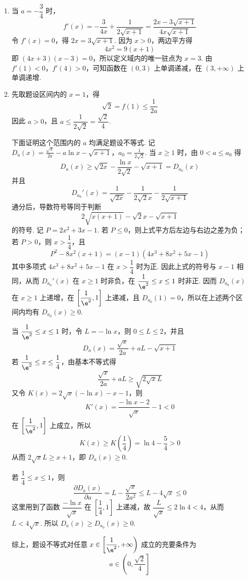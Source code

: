 \begin{solution}
\begin{enumerate}
\item 当 \(a=-\dfrac34\) 时，
\[
f'(x)=-\frac{3}{4x}+\frac{1}{2\sqrt{x+1}}=\frac{2x-3\sqrt{x+1}}{4x\sqrt{x+1}}
\]
令 \(f'(x)=0\)，得 \(2x=3\sqrt{x+1}\). 因为 \(x>0\)，两边平方得
\[
4x^2=9(x+1)
\]
即 \((4x+3)(x-3)=0\)，所以定义域内的唯一驻点为 \(x=3\). 由 \(f'(1)<0\)，\(f'(4)>0\)，可知函数在 \((0,3)\) 上单调递减，在 \((3,+\infty)\) 上单调递增.

\item 先取题设区间内的 \(x=1\)，得
\[
\sqrt2=f(1)\le\frac{1}{2a}
\]
因此 \(a>0\)，且 \(a\le\dfrac{1}{2\sqrt2}=\dfrac{\sqrt2}{4}\).

下面证明这个范围内的 \(a\) 均满足题设不等式. 记
\(D_a(x)=\frac{\sqrt{x}}{2a}-a\ln x-\sqrt{x+1}\)，\(a_0=\frac{1}{2\sqrt2}\).
当 \(x\ge1\) 时，由 \(0<a\le a_0\) 得
\[
D_a(x)\ge\sqrt{2x}-\frac{\ln x}{2\sqrt2}-\sqrt{x+1}=D_{a_0}(x)
\]
并且
\[
D_{a_0}'(x)=\frac{1}{\sqrt{2x}}-\frac{1}{2\sqrt2x}-\frac{1}{2\sqrt{x+1}}
\]
通分后，导数符号等同于判断
\[
2\sqrt{x(x+1)}-\sqrt2x-\sqrt{x+1}
\]
的符号. 记 \(P=2x^2+3x-1\). 若 \(P\le0\)，则上式平方后左边与右边之差为负；若 \(P>0\)，则 \(x>\dfrac14\)，且
\[
P^2-8x^2(x+1)=(x-1)(4x^3+8x^2+5x-1)
\]
其中多项式 \(4x^3+8x^2+5x-1\) 在 \(x>\dfrac14\) 时为正. 因此上式的符号与 \(x-1\) 相同，从而 \(D_{a_0}'(x)\) 在 \(x\ge1\) 时非负，在 \(\dfrac1{\e^2}\le x\le1\) 时非正. 因而 \(D_{a_0}(x)\) 在 \(x\ge1\) 上递增，在 \(\left[\dfrac1{\e^2},1\right]\) 上递减，且 \(D_{a_0}(1)=0\)，所以在上述两个区间内均有 \(D_{a_0}(x)\ge0\).

当 \(\dfrac1{\e^2}\le x\le1\) 时，令 \(L=-\ln x\)，则 \(0\le L\le2\)，并且
\[
D_a(x)=\frac{\sqrt{x}}{2a}+aL-\sqrt{x+1}
\]
若 \(\dfrac1{\e^2}\le x\le\dfrac14\)，由基本不等式得
\[
\frac{\sqrt{x}}{2a}+aL\ge\sqrt{2\sqrt{x}L}
\]
又令 \(K(x)=2\sqrt{x}(-\ln x)-x-1\)，则
\[
K'(x)=\frac{-\ln x-2}{\sqrt{x}}-1<0
\]
在 \(\left[\dfrac1{\e^2},1\right]\) 上成立，所以
\[
K(x)\ge K\left(\frac14\right)=\ln4-\frac54>0
\]
从而 \(2\sqrt{x}L\ge x+1\)，即 \(D_a(x)\ge0\).

若 \(\dfrac14\le x\le1\)，则
\[
\frac{\partial D_a(x)}{\partial a}=L-\frac{\sqrt{x}}{2a^2}\le L-4\sqrt{x}\le0
\]
这里用到了函数 \(\dfrac{-\ln x}{\sqrt{x}}\) 在 \(\left[\dfrac14,1\right]\) 上递减，故 \(\dfrac{L}{\sqrt{x}}\le2\ln4<4\)，从而 \(L<4\sqrt{x}\). 所以 \(D_a(x)\ge D_{a_0}(x)\ge0\).

综上，题设不等式对任意 \(x\in\left[\dfrac1{\e^2},+\infty\right)\) 成立的充要条件为
\[
a\in\left(0,\frac{\sqrt2}{4}\right]
\]
\end{enumerate}
\end{solution}
